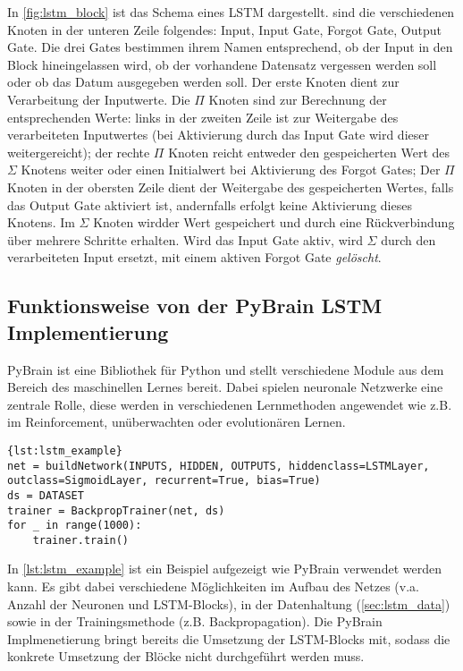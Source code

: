 In \autoref{fig:lstm_block} ist das Schema eines \ac{LSTM} dargestellt. sind die
verschiedenen Knoten in der unteren Zeile folgendes: Input, Input Gate, Forgot
Gate, Output Gate. Die drei Gates bestimmen ihrem Namen entsprechend, ob der
Input in den Block hineingelassen wird, ob der vorhandene Datensatz vergessen
werden soll oder ob das Datum ausgegeben werden soll. Der erste Knoten dient zur
Verarbeitung der Inputwerte. Die $\Pi$ Knoten sind zur Berechnung der
entsprechenden Werte:
links in der zweiten Zeile ist zur Weitergabe des verarbeiteten Inputwertes
(bei Aktivierung durch das Input Gate wird dieser weitergereicht); der rechte
$\Pi$ Knoten reicht entweder den gespeicherten Wert des $\Sigma$ Knotens weiter
oder einen Initialwert bei Aktivierung des Forgot Gates; Der $\Pi$ Knoten in der
obersten Zeile dient der Weitergabe des gespeicherten Wertes, falls das Output
Gate aktiviert ist, andernfalls erfolgt keine Aktivierung dieses Knotens. Im
$\Sigma$ Knoten wirdder Wert gespeichert und durch eine Rückverbindung über
mehrere Schritte erhalten. Wird das Input Gate aktiv, wird $\Sigma$ durch den
verarbeiteten Input ersetzt, mit einem aktiven Forgot Gate \textit{gelöscht}. 

\subsection{Funktionsweise von der \acs{PyBrain} \acs{LSTM} Implementierung}
\ac{PyBrain}\cite{schaul2010} ist eine Bibliothek für Python und stellt
verschiedene Module aus dem Bereich des maschinellen Lernes bereit. Dabei
spielen neuronale Netzwerke eine zentrale Rolle, diese werden in verschiedenen
Lernmethoden angewendet wie z.B. im Reinforcement, unüberwachten oder
evolutionären Lernen.

\begin{lstlisting}[caption={Aufbau eines LSTM Netzes},label={lst:lstm_example}]{lst:lstm_example} 
net = buildNetwork(INPUTS, HIDDEN, OUTPUTS, hiddenclass=LSTMLayer,
outclass=SigmoidLayer, recurrent=True, bias=True) 
ds = DATASET 
trainer = BackpropTrainer(net, ds)
for _ in range(1000):
    trainer.train()
\end{lstlisting}
 
In \autoref{lst:lstm_example} ist ein Beispiel aufgezeigt wie \ac{PyBrain}
verwendet werden kann. Es gibt dabei verschiedene Möglichkeiten im Aufbau des
Netzes (v.a. Anzahl der Neuronen und \ac{LSTM}-Blocks), in der Datenhaltung
(\ref{sec:lstm_data}) sowie in der Trainingsmethode (z.B. Backpropagation).
Die \ac{PyBrain} Implmenetierung bringt bereits die Umsetzung der
\ac{LSTM}-Blocks mit, sodass die konkrete Umsetzung der Blöcke nicht
durchgeführt werden muss.

